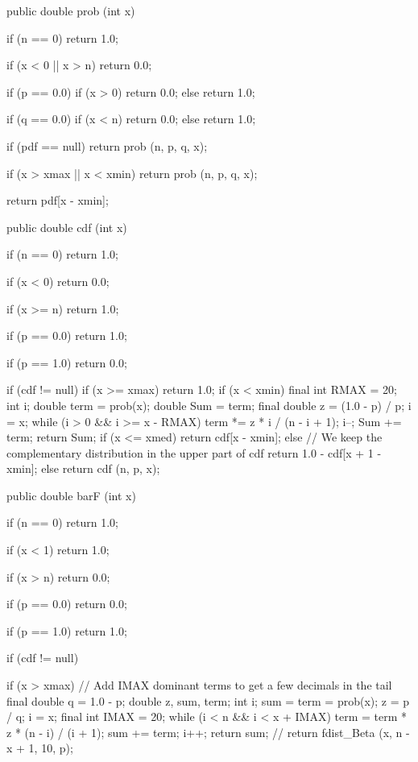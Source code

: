 \begin{code}\begin{hide}
   public double prob (int x) {
      if (n == 0)
         return 1.0;

      if (x < 0 || x > n)
         return 0.0;

      if (p == 0.0) {
         if (x > 0)
            return 0.0;
         else
            return 1.0;
      }

      if (q == 0.0) {
         if (x < n)
            return 0.0;
         else
            return 1.0;
      }

      if (pdf == null)
         return prob (n, p, q, x);

      if (x > xmax || x < xmin)
         return prob (n, p, q, x);

      return pdf[x - xmin];
   }


   public double cdf (int x) {
      if (n == 0)
         return 1.0;

      if (x < 0)
         return 0.0;

      if (x >= n)
         return 1.0;

      if (p == 0.0)
         return 1.0;

      if (p == 1.0)
         return 0.0;

      if (cdf != null) {
         if (x >= xmax)
            return 1.0;
         if (x < xmin) {
            final int RMAX = 20;
            int i;
            double term = prob(x);
            double Sum = term;
            final double z = (1.0 - p) / p;
            i = x;
            while (i > 0 && i >= x - RMAX) {
               term *= z * i / (n - i + 1);
               i--;
               Sum += term;
            }
            return Sum;
         }
         if (x <= xmed)
            return cdf[x - xmin];
         else
            // We keep the complementary distribution in the upper part of cdf
            return 1.0 - cdf[x + 1 - xmin];
      } else
         return cdf (n, p, x);
   }


   public double barF (int x) {
      if (n == 0)
         return 1.0;

      if (x < 1)
         return 1.0;

      if (x > n)
         return 0.0;

      if (p == 0.0)
         return 0.0;

      if (p == 1.0)
         return 1.0;

      if (cdf != null) {
         if (x > xmax) {
            // Add IMAX dominant terms to get a few decimals in the tail
            final double q = 1.0 - p;
            double z, sum, term;
            int i;
            sum = term = prob(x);
            z = p / q;
            i = x;
            final int IMAX = 20;
            while (i < n && i < x + IMAX) {
               term = term * z * (n - i) / (i + 1);
               sum += term;
               i++;
            }
            return sum;
            // return fdist_Beta (x, n - x + 1, 10, p);
         }

}}
\end{hide}
\end{code}
